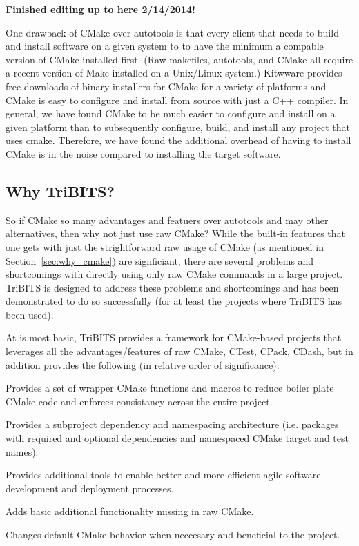 \documentclass[10pt]{article}
\begin{document}
\textbf{Finished editing up to here 2/14/2014!}

One drawback of CMake over autotools is that every client that needs to build and install software on a given system to to have the minimum a compable version of CMake installed first.  (Raw makefiles, autotools, and CMake all require a recent version of Make installed on a Unix/Linux system.)  Kitwware provides free downloads of binary installers for CMake for a variety of platforms and CMake is easy to configure and install from source with just a C++ compiler.  In general, we have found CMake to be much easier to configure and install on a given platform than to subsequently configure, build, and install any project that uses cmake.  Therefore, we have found the additional overhead of having to install CMake is in the noise compared to installing the target software.

%
\subsection{Why TriBITS?}
%

So if CMake so many advantages and featuers over autotools and may other alternatives, then why not just use raw CMake?  While the built-in features that one gets with just the strightforward raw usage of CMake (as mentioned in Section~\ref{sec:why_cmake}) are signficiant, there are several problems and shortcomings with directly using only raw CMake commands in a large project.  TriBITS is designed to address these problems and shortcomings and has been demonstrated to do so successfully (for at least the projects where TriBITS has been used).

At is most basic, TriBITS provides a framework for CMake-based projects that leverages all the advantages/features of raw CMake, CTest, CPack, CDash, but in addition provides the following (in relative order of significance):

\begin{compactitem}
\item Provides a set of wrapper CMake functions and macros to reduce boiler plate CMake code and enforces consistancy across the entire project.
\item Provides a subproject dependency and namespacing architecture (i.e. packages with required and optional dependencies and namespaced CMake target and test names).
\item Provides additional tools to enable better and more efficient agile software development and deployment processes.
\item Adds basic additional functionality missing in raw CMake.
\item Changes default CMake behavior when neccesary and beneficial to the project.
\end{compactitem}
\end{document}
